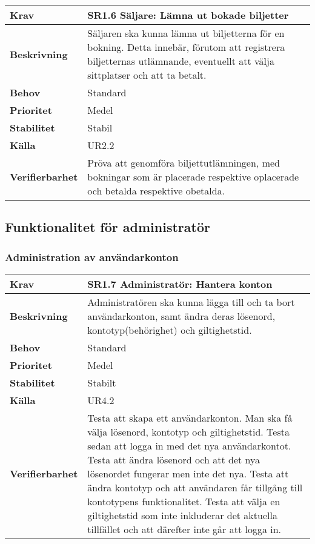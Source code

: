\documentclass[a4paper, twoside, 11pt, titlepage]{article}
\begin{document}
	\begin{tabular} { p{2.6cm} p{12.5cm} }
		\hline
		\sffamily\textbf{Krav} & \sffamily\textbf{SR1.6 Säljare: Lämna ut bokade biljetter } \\
		\hline
		\sffamily\textbf{Beskrivning} & Säljaren ska kunna lämna ut biljetterna för en bokning. Detta innebär, förutom att registrera biljetternas utlämnande, eventuellt att välja sittplatser och att ta betalt.  \\
		\hline
		\sffamily\textbf{Behov} & Standard  \\
		\hline
		\sffamily\textbf{Prioritet} & Medel  \\
		\hline
		\sffamily\textbf{Stabilitet} & Stabil  \\
		\hline
		\sffamily\textbf{Källa} & UR2.2  \\
		\hline
		\sffamily\textbf{Verifierbarhet} & Pröva att genomföra biljettutlämningen, med bokningar som är placerade respektive oplacerade och betalda respektive obetalda.  \\
		\hline
	\end{tabular}


	\subsection{Funktionalitet för administratör}



		\subsubsection{Administration av användarkonton}


		\begin{tabular} { p{2.6cm} p{12.5cm} }
			\hline
			\sffamily\textbf{Krav} & \sffamily\textbf{SR1.7 Administratör: Hantera konton } \\
			\hline
			\sffamily\textbf{Beskrivning} & Administratören ska kunna lägga till och ta bort användarkonton, samt ändra deras lösenord, kontotyp(behörighet) och giltighetstid.  \\
			\hline
			\sffamily\textbf{Behov} & Standard  \\
			\hline
			\sffamily\textbf{Prioritet} & Medel  \\
			\hline
			\sffamily\textbf{Stabilitet} & Stabilt  \\
			\hline
			\sffamily\textbf{Källa} & UR4.2  \\
			\hline
			\sffamily\textbf{Verifierbarhet} & Testa att skapa ett användarkonton. Man ska få välja lösenord, kontotyp och giltighetstid. Testa sedan att logga in med det nya användarkontot. Testa att ändra lösenord och att det nya lösenordet fungerar men inte det nya. Testa att ändra kontotyp och att användaren får tillgång till kontotypens funktionalitet. Testa att välja en giltighetstid som inte inkluderar det aktuella tillfället och att därefter inte går att logga in.  \\
			\hline
		\end{tabular}
		\vspace{6mm}
\end{document}
